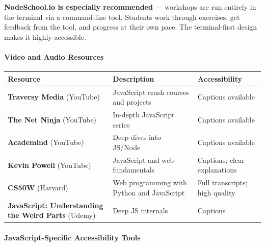 \documentclass[
  justified,
  openright,
]{tufte-book}
\let\subsection\paragraph
\let\paragraph\paragraph
\let\subsection\paragraph
\let\paragraph\paragraph
\begin{document}
\textbf{NodeSchool.io is especially recommended} --- workshops are run
entirely in the terminal via a command-line tool. Students work through
exercises, get feedback from the tool, and progress at their own pace.
The terminal-first design makes it highly accessible.

\subsection{Video and Audio
Resources}\label{video-and-audio-resources}

\begin{fullwidth}{\def\LTcaptype{none} %
\begin{longtable}[]{@{}
  >{\raggedright\arraybackslash}p{}
  >{\raggedright\arraybackslash}p{}
  >{\raggedright\arraybackslash}p{}@{}}
\toprule\noalign{}
\begin{minipage}[b]{\linewidth}\raggedright
Resource
\end{minipage} & \begin{minipage}[b]{\linewidth}\raggedright
Description
\end{minipage} & \begin{minipage}[b]{\linewidth}\raggedright
Accessibility
\end{minipage} \\
\midrule\noalign{}
\endhead
\bottomrule\noalign{}
\endlastfoot
\textbf{Traversy Media} (YouTube) & JavaScript crash courses and
projects & Captions available \\
\textbf{The Net Ninja} (YouTube) & In-depth JavaScript series & Captions
available \\
\textbf{Academind} (YouTube) & Deep dives into JS/Node & Captions
available \\
\textbf{Kevin Powell} (YouTube) & JavaScript and web fundamentals &
Captions; clear explanations \\
\textbf{CS50W} (Harvard) & Web programming with Python and JavaScript &
Full transcripts; high quality \\
\textbf{JavaScript: Understanding the Weird Parts} (Udemy) & Deep JS
internals & Captions \\
\end{longtable}
}
\end{fullwidth}

\subsection{JavaScript-Specific Accessibility
Tools}\label{javascript-specific-accessibility-tools}
\end{document}
